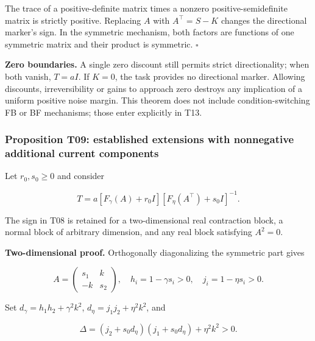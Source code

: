 \documentclass[11pt,a4paper]{article}
\begin{document}
The trace of a positive-definite matrix times a nonzero
positive-semidefinite matrix is strictly positive. Replacing \(A\) with
\(A^\top=S-K\) changes the directional marker's sign. In the symmetric
mechanism, both factors are functions of one symmetric matrix and their
product is symmetric. \(\square\)

\textbf{Zero boundaries.} A single zero discount still permits strict
directionality; when both vanish, \(T=aI\). If \(K=0\), the task
provides no directional marker. Allowing discounts, irreversibility or
gains to approach zero destroys any implication of a uniform positive
noise margin. This theorem does not include condition-switching FB or BF
mechanisms; those enter explicitly in T13.

\subsubsection{Proposition T09: established extensions with nonnegative
additional current
components}\label{proposition-t09-established-extensions-with-nonnegative-additional-current-components}

\par
\noindent\begin{minipage}{\linewidth}

Let \(r_0,s_0\ge0\) and consider

\[
T=a[F_\gamma(A)+r_0I][F_\eta(A^\top)+s_0I]^{-1}.
\]

\end{minipage}\par

The sign in T08 is retained for a two-dimensional real contraction
block, a normal block of arbitrary dimension, and any real block
satisfying \(A^2=0\).

\par
\noindent\begin{minipage}{\linewidth}

\textbf{Two-dimensional proof.} Orthogonally diagonalizing the symmetric
part gives

\[
A=\begin{pmatrix}s_1&k\\-k&s_2\end{pmatrix},\quad
h_i=1-\gamma s_i>0,\quad j_i=1-\eta s_i>0.
\]

\end{minipage}\par

\par
\noindent\begin{minipage}{\linewidth}

Set \(d_\gamma=h_1h_2+\gamma^2k^2\), \(d_\eta=j_1j_2+\eta^2k^2\), and

\[
\Delta=(j_2+s_0d_\eta)(j_1+s_0d_\eta)+\eta^2k^2>0.
\]

\end{minipage}\par
\end{document}

